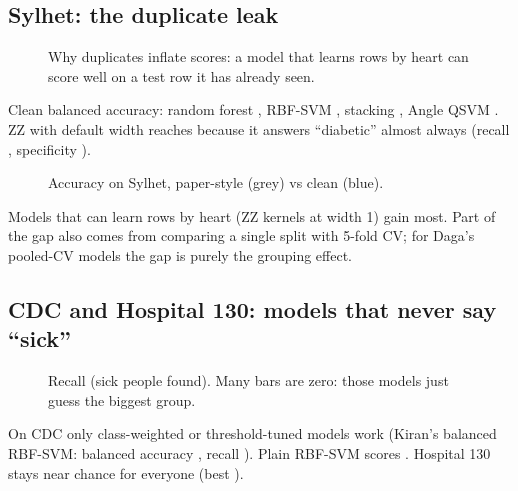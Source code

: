 \documentclass[11pt,a4paper]{article}
\begin{document}
\subsection{Sylhet: the duplicate leak}
\begin{figure}[H]\centering
{}\caption{Why duplicates inflate scores: a model that learns rows by heart can score well on a test row it has already seen.}\end{figure}
Clean balanced accuracy: random forest \mSylRFba, RBF-SVM \mSylRBFba, stacking \mSylStackba, Angle QSVM \mSylAngleba. ZZ with default width reaches \mSylZZba because it answers ``diabetic'' almost always (recall \mSylZZrec, specificity \mSylZZspec).
\begin{figure}[H]\centering\caption{Accuracy on Sylhet, paper-style (grey) vs clean (blue).}\end{figure}
\begin{table}[H]\centering\small\caption{Sylhet leak size (accuracy points, paper-style minus clean). Gaps use unrounded values, so they can differ by 0.1 from the rounded columns.}
\end{table}
Models that can learn rows by heart (ZZ kernels at width 1) gain most. Part of the gap also comes from comparing a single split with 5-fold CV; for Daga's pooled-CV models the gap is purely the grouping effect.

\subsection{CDC and Hospital 130: models that never say ``sick''}
\begin{figure}[H]\centering\caption{Recall (sick people found). Many bars are zero: those models just guess the biggest group.}\end{figure}
On CDC only class-weighted or threshold-tuned models work (Kiran's balanced RBF-SVM: balanced accuracy \mCdcKiranRBFba, recall \mCdcKiranRBFrec). Plain RBF-SVM scores \mCdcRBFba. Hospital 130 stays near chance for everyone (best \mHospBestba).
\end{document}
